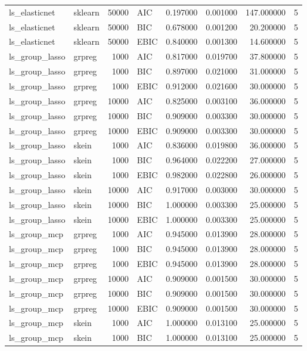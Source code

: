 \begin{table}[t]
\begin{tabular}{llrlrrrr}
ls_elasticnet & sklearn & 50000 & AIC & 0.197000 & 0.001000 & 147.000000 & 5 \\
ls_elasticnet & sklearn & 50000 & BIC & 0.678000 & 0.001200 & 20.200000 & 5 \\
ls_elasticnet & sklearn & 50000 & EBIC & 0.840000 & 0.001300 & 14.600000 & 5 \\
ls_group_lasso & grpreg & 1000 & AIC & 0.817000 & 0.019700 & 37.800000 & 5 \\
ls_group_lasso & grpreg & 1000 & BIC & 0.897000 & 0.021000 & 31.000000 & 5 \\
ls_group_lasso & grpreg & 1000 & EBIC & 0.912000 & 0.021600 & 30.000000 & 5 \\
ls_group_lasso & grpreg & 10000 & AIC & 0.825000 & 0.003100 & 36.000000 & 5 \\
ls_group_lasso & grpreg & 10000 & BIC & 0.909000 & 0.003300 & 30.000000 & 5 \\
ls_group_lasso & grpreg & 10000 & EBIC & 0.909000 & 0.003300 & 30.000000 & 5 \\
ls_group_lasso & skein & 1000 & AIC & 0.836000 & 0.019800 & 36.000000 & 5 \\
ls_group_lasso & skein & 1000 & BIC & 0.964000 & 0.022200 & 27.000000 & 5 \\
ls_group_lasso & skein & 1000 & EBIC & 0.982000 & 0.022800 & 26.000000 & 5 \\
ls_group_lasso & skein & 10000 & AIC & 0.917000 & 0.003000 & 30.000000 & 5 \\
ls_group_lasso & skein & 10000 & BIC & 1.000000 & 0.003300 & 25.000000 & 5 \\
ls_group_lasso & skein & 10000 & EBIC & 1.000000 & 0.003300 & 25.000000 & 5 \\
ls_group_mcp & grpreg & 1000 & AIC & 0.945000 & 0.013900 & 28.000000 & 5 \\
ls_group_mcp & grpreg & 1000 & BIC & 0.945000 & 0.013900 & 28.000000 & 5 \\
ls_group_mcp & grpreg & 1000 & EBIC & 0.945000 & 0.013900 & 28.000000 & 5 \\
ls_group_mcp & grpreg & 10000 & AIC & 0.909000 & 0.001500 & 30.000000 & 5 \\
ls_group_mcp & grpreg & 10000 & BIC & 0.909000 & 0.001500 & 30.000000 & 5 \\
ls_group_mcp & grpreg & 10000 & EBIC & 0.909000 & 0.001500 & 30.000000 & 5 \\
ls_group_mcp & skein & 1000 & AIC & 1.000000 & 0.013100 & 25.000000 & 5 \\
ls_group_mcp & skein & 1000 & BIC & 1.000000 & 0.013100 & 25.000000 & 5 \\

\end{tabular}
\end{table}
